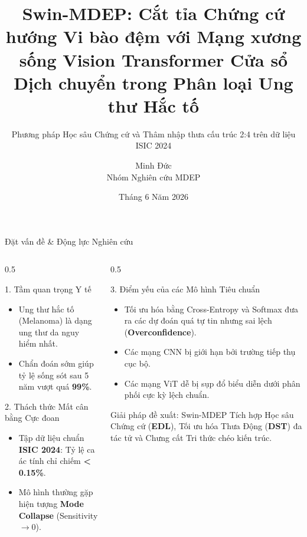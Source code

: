 \documentclass[aspectratio=169, 10pt]{beamer}
\title[Swin-MDEP \& ResNet-50 MDEP]{Swin-MDEP: Cắt tỉa Chứng cứ hướng Vi bào đệm với Mạng xương sống Vision Transformer Cửa sổ Dịch chuyển trong Phân loại Ung thư Hắc tố}
\subtitle{Phương pháp Học sâu Chứng cứ và Thâm nhập thưa cấu trúc 2:4 trên dữ liệu ISIC 2024}
\author[Minh Đức]{Minh Đức \\ \small Nhóm Nghiên cứu MDEP}
\institute[MDEP Research]{MDEP Research Team \\ \texttt{minhduc110207@github.com}}
\date[Tháng 6, 2026]{Tháng 6 Năm 2026}
\begin{document}
\begin{frame}
  \titlepage
\end{frame}

\begin{frame}{Đặt vấn đề \& Động lực Nghiên cứu}
  \begin{columns}
    \begin{column}{0.5\textwidth}
      \begin{block}{1. Tầm quan trọng Y tế}
        \begin{itemize}
          \item Ung thư hắc tố (Melanoma) là dạng ung thư da nguy hiểm nhất.
          \item Chẩn đoán sớm giúp tỷ lệ sống sót sau 5 năm vượt quá \textbf{99\%}.
        \end{itemize}
      \end{block}
      \begin{block}{2. Thách thức Mất cân bằng Cực đoan}
        \begin{itemize}
          \item Tập dữ liệu chuẩn \textbf{ISIC 2024}: Tỷ lệ ca ác tính chỉ chiếm \textbf{< 0.15\%}.
          \item Mô hình thường gặp hiện tượng \textbf{Mode Collapse} (Sensitivity $\to 0$).
        \end{itemize}
      \end{block}
    \end{column}
    \begin{column}{0.5\textwidth}
      \begin{block}{3. Điểm yếu của các Mô hình Tiêu chuẩn}
        \begin{itemize}
          \item Tối ưu hóa bằng Cross-Entropy và Softmax đưa ra các dự đoán quá tự tin nhưng sai lệch (\textbf{Overconfidence}).
          \item Các mạng CNN bị giới hạn bởi trường tiếp thụ cục bộ.
          \item Các mạng ViT dễ bị sụp đổ biểu diễn dưới phân phối cực kỳ lệch chuẩn.
        \end{itemize}
      \end{block}
      \begin{alertblock}{Giải pháp đề xuất: Swin-MDEP}
        Tích hợp Học sâu Chứng cứ (\textbf{EDL}), Tối ưu hóa Thưa Động (\textbf{DST}) đa tác tử và Chưng cất Tri thức chéo kiến trúc.
      \end{alertblock}
    \end{column}
  \end{columns}
\end{frame}
\end{document}
